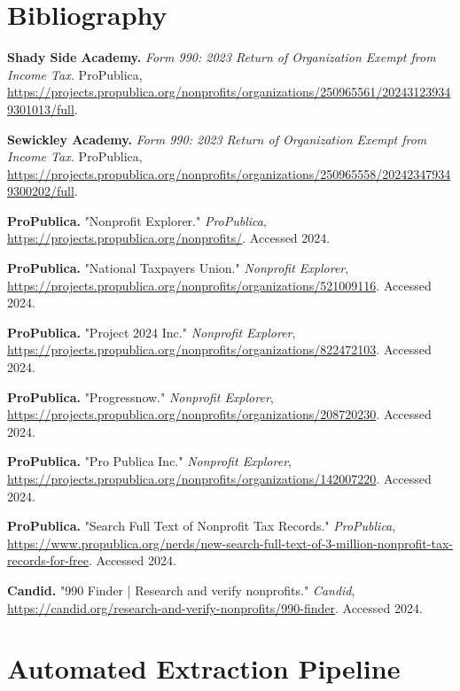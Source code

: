 \documentclass[12pt]{article}
\begin{document}
\section{Bibliography}

\textbf{Shady Side Academy.} \textit{Form 990: 2023 Return of Organization Exempt from Income Tax.} ProPublica, \href{https://projects.propublica.org/nonprofits/organizations/250965561/202431239349301013/full}{https://projects.propublica.org/nonprofits/organizations/250965561/202431239349301013/full}.

\textbf{Sewickley Academy.} \textit{Form 990: 2023 Return of Organization Exempt from Income Tax.} ProPublica, \href{https://projects.propublica.org/nonprofits/organizations/250965558/202423479349300202/full}{https://projects.propublica.org/nonprofits/organizations/250965558/202423479349300202/full}.

\textbf{ProPublica.} "Nonprofit Explorer." \textit{ProPublica}, \href{https://projects.propublica.org/nonprofits/}{https://projects.propublica.org/nonprofits/}. Accessed 2024.

\textbf{ProPublica.} "National Taxpayers Union." \textit{Nonprofit Explorer}, \href{https://projects.propublica.org/nonprofits/organizations/521009116}{https://projects.propublica.org/nonprofits/organizations/521009116}. Accessed 2024.

\textbf{ProPublica.} "Project 2024 Inc." \textit{Nonprofit Explorer}, \href{https://projects.propublica.org/nonprofits/organizations/822472103}{https://projects.propublica.org/nonprofits/organizations/822472103}. Accessed 2024.

\textbf{ProPublica.} "Progressnow." \textit{Nonprofit Explorer}, \href{https://projects.propublica.org/nonprofits/organizations/208720230}{https://projects.propublica.org/nonprofits/organizations/208720230}. Accessed 2024.

\textbf{ProPublica.} "Pro Publica Inc." \textit{Nonprofit Explorer}, \href{https://projects.propublica.org/nonprofits/organizations/142007220}{https://projects.propublica.org/nonprofits/organizations/142007220}. Accessed 2024.

\textbf{ProPublica.} "Search Full Text of Nonprofit Tax Records." \textit{ProPublica}, \href{https://www.propublica.org/nerds/new-search-full-text-of-3-million-nonprofit-tax-records-for-free}{https://www.propublica.org/nerds/new-search-full-text-of-3-million-nonprofit-tax-records-for-free}. Accessed 2024.

\textbf{Candid.} "990 Finder | Research and verify nonprofits." \textit{Candid}, \href{https://candid.org/research-and-verify-nonprofits/990-finder}{https://candid.org/research-and-verify-nonprofits/990-finder}. Accessed 2024.

\appendix
\section{Automated Extraction Pipeline}
\label{app:pipeline}





\end{document}
